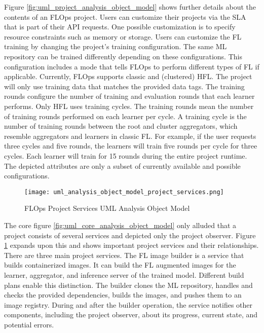 Figure \ref{fig:uml_project_analysis_object_model} shows further details about the contents of an FLOps project.
Users can customize their projects via the SLA that is part of their API requests.
One possible customization is to specify resource constraints such as memory or storage.
Users can customize the FL training by changing the project's training configuration.
The same ML repository can be trained differently depending on these configurations.
This configuration includes a mode that tells FLOps to perform different types of FL if applicable.
Currently, FLOps supports classic and (clustered) HFL.
The project will only use training data that matches the provided data tags.
The training rounds configure the number of training and evaluation rounds that each learner performs.
Only HFL uses training cycles.
The training rounds mean the number of training rounds performed on each learner per cycle.
A training cycle is the number of training rounds between the root and cluster aggregators, which resemble aggregators and learners in classic FL.
For example, if the user requests three cycles and five rounds, the learners will train five rounds per cycle for three cycles.
Each learner will train for 15 rounds during the entire project runtime.
The depicted attributes are only a subset of currently available and possible configurations.

\begin{figure}[h]
    \begin{adjustwidth}{-0.1\paperwidth}{-0.1\paperwidth}
        \centering
        \texttt{[image: uml\_analysis\_object\_model\_project\_services.png]}
        \caption{FLOps Project Services UML Analysis Object Model}
        \label{fig:uml_project_services_analysis_object_model}
    \end{adjustwidth}
\end{figure}

The core figure \ref{fig:uml_core_analysis_object_model} only alluded that a project consists of several services and depicted only the project observer.
Figure \ref{fig:uml_project_services_analysis_object_model} expands upon this and shows important project services and their relationships.
There are three main project services.
The FL image builder is a service that builds containerized images.
It can build the FL augmented images for the learner, aggregator, and inference server of the trained model.
Different build plans enable this distinction.
The builder clones the ML repository, handles and checks the provided dependencies, builds the images, and pushes them to an image registry.
During and after the builder operation, the service notifies other components, including the project observer, about its progress, current state, and potential errors.

